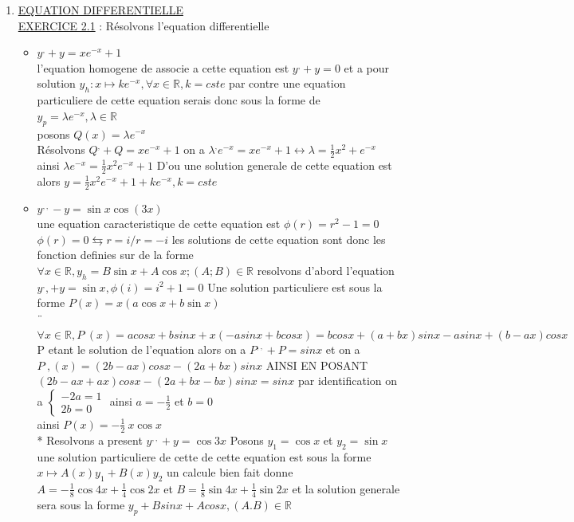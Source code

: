 \documentclass[a4paper,12pt]{article}
\begin{document}
\begin{enumerate}
  \\
  		\item  \underline{EQUATION DIFFERENTIELLE}\\ \underline{EXERCICE 2.1} : Résolvons l'equation differentielle\\
 		\begin{itemize}
 			\item $ y^,+y=xe^{-x} + 1$\\
 			l'equation homogene de associe a cette equation est $y^,+y=0$ et a pour solution $y_h:x\mapsto ke^{-x} ,\forall x\in{}, k=cste$ par contre une equation particuliere de cette equation serais donc sous la forme de $y_p=\lambda e^{-x} , \lambda\in{}$ \\ posons $Q(x)=\lambda e^{-x}$ \\
  			Résolvons $Q^, + Q = xe^{-x} +1$ on a $\lambda^, e^{-x} = xe^{-x} +1 \leftrightarrow \lambda=x^2 +e^{-x}$ ainsi $\lambda e^{-x}=x^2 e^{-x} + 1$ D'ou une solution generale de cette equation est alors $y=x^2 e^{-x} + 1 + ke^{-x} , k=cste$\\  \item $y^{,,} - y = \sin x \cos(3x)$ \\ une equation caracteristique de cette equation est $\phi(r)=r^2 - 1=0$  $\phi(r)=0 \leftrightarrows r=i /  r= -i$ 	les solutions de cette equation sont donc les fonction definies sur  de la forme $\forall x \in {}, y_h=B\sin x + A \cos x ; (A;B)\in {}$ resolvons d'abord l'equation $y^,, + y =\sin x , \phi(i)=i^2 +1 =0$		 Une solution particuliere est sous la forme $P(x)= x(a\cos x+ b\sin x)$  \\ ¨$\forall x \in{}, P^,(x)= acosx + bsin x +x(-asinx + bcos x) = bcos x + (a+bx)sinx -asinx +(b-ax)cos x$ P etant le solution de l'equation alors on a  $P^{,,} +P=sinx$ et  on a $P^,,(x)=(2b - ax)cos x -(2a + bx )sinx$ AINSI EN POSANT $(2b - ax +ax)cosx - ( 2a +bx- bx)sinx=sinx$ par identification on a $\begin{cases}
 				-2a = 1 \\
 				2b= 0
 			\end{cases}$ ainsi $a=-$ et  $ b=0$\\ ainsi $P(x)= -\ x \cos x$ \\ * Resolvons a present $y^{,,} +y = \cos 3x$ Posons $y_1=\cos x$  et $y_2=\sin x$\\ une solution particuliere de cette de cette equation est sous la forme $x\mapsto A(x)y_1 + B(x)y_2$ un calcule bien fait donne   $A = -\cos 4x + \cos 2x$ et $B= \sin 4x + \sin 2x$ et la solution generale sera sous la forme $y_p + Bsin x + Acosx  , (A.B)\in {}$

\end{itemize}
\end{enumerate}
\end{document}
